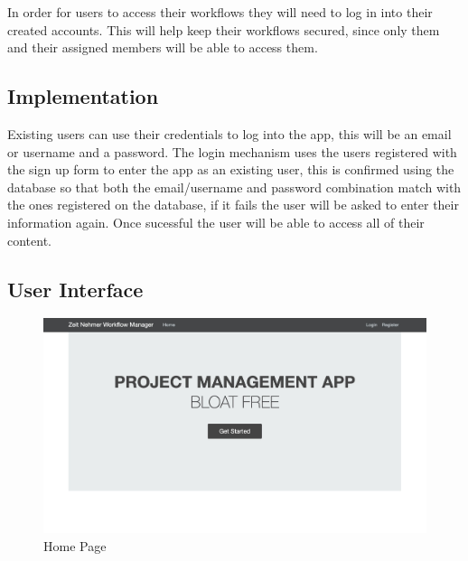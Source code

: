 \documentclass{article}[draft]
\begin{document}
  In order for users to access their workflows they will need to log in into their created accounts. This will help keep their workflows secured, since only them and their assigned members will be able to access them.

  \subsection{Implementation}

  Existing users can use their credentials to log into the app, this will be an email or username and a password. The login mechanism uses the users registered with the sign up form to enter the app as an existing user, this is confirmed using the database so that both the email/username and password combination match with the ones registered on the database, if it fails the user will be asked to enter their information again. Once sucessful the user will be able to access all of their content.

  \subsection{User Interface}
\begin{figure}[h!]
     \centering
      \includegraphics[width=1.2\columnwidth]{Images/homepage.jpg}
      \caption{Home Page}
      \label{fig:figure 3}
\end{figure}
\end{document}

